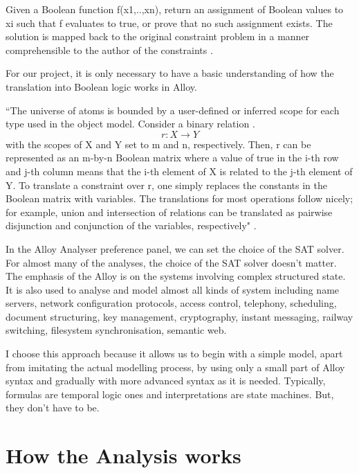 \documentclass[a4paper,10pt]{report}
\begin{document}
Given a Boolean function f(x1,..,xn), return an assignment of Boolean values to xi such that f evaluates to true, or prove that no such assignment exists. The solution is mapped back to the original constraint problem in a manner comprehensible to the author of the constraints \cite{Yeung2005}.

For our project, it is only necessary to have a basic understanding of how the translation into Boolean logic works in Alloy. 
 
``The universe of atoms is bounded by a user-defined or inferred scope for each type used in the object model. Consider a binary relation .
\begin{equation}
r : X \rightarrow Y
\end{equation} with the scopes of X and Y set to m and n, respectively. Then, r can be represented as an m-by-n Boolean matrix where a value of true in the i-th row and j-th column means that the i-th element of X is related to the j-th element of Y. To translate a constraint over r, one simply replaces the constants in the Boolean matrix with variables. The translations for most operations follow nicely; for example, union and intersection of relations can be translated as pairwise disjunction and conjunction of the variables, respectively" \cite{Yeung2005}.

In the Alloy Analyser preference panel, we can set the choice of the SAT solver. For almost many of the analyses, the choice of the SAT solver doesn't matter. The emphasis of the Alloy is on the systems involving complex structured state. It is also used to analyse and model almost all kinds of system including name servers, network configuration protocols, access control, telephony, scheduling, document structuring, key management, cryptography, instant messaging, railway switching, filesystem synchronisation, semantic web. 

I choose this approach because it allows us to begin with a simple model, apart from imitating the actual modelling process, by using only a small part of Alloy syntax and gradually with more advanced syntax as it is needed. Typically, formulas are temporal logic ones and interpretations are state machines. But, they don't have to be.

\section{How the Analysis works}
\label{Working of analyses}
\end{document}
